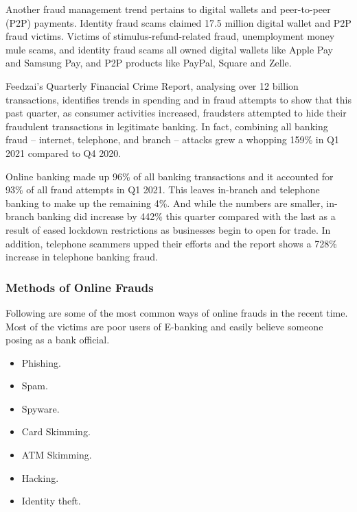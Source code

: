 \documentclass[12pt, oneside, a4paper]{article}
\begin{document}
Another fraud management trend pertains to digital wallets and peer-to-peer (P2P) payments. Identity fraud scams claimed 17.5 million digital wallet and P2P fraud victims. Victims of stimulus-refund-related fraud, unemployment money mule scams, and identity fraud scams all owned digital wallets like Apple Pay and Samsung Pay, and P2P products like PayPal, Square and Zelle. 

Feedzai's Quarterly Financial Crime Report, analysing over 12 billion transactions, identifies trends in spending and in fraud attempts to show that this past quarter, as consumer activities increased, fraudsters attempted to hide their fraudulent transactions in legitimate banking. In fact, combining all banking fraud  – internet, telephone, and branch – attacks grew a whopping 159\% in Q1 2021 compared to Q4 2020. 

Online banking made up 96\% of all banking transactions and it accounted for 93\% of all fraud attempts in Q1 2021. This leaves in-branch and telephone banking to make up the remaining 4\%. And while the numbers are smaller, in-branch banking did increase by 442\% this quarter compared with the last as a result of eased lockdown restrictions as businesses begin to open for trade. In addition, telephone scammers upped their efforts and the report shows a 728\% increase in telephone banking fraud.

\subsubsection{Methods of Online Frauds}
Following are some of the most common ways of online frauds in the recent time. Most of the victims are poor users of E-banking and easily believe someone posing as a bank official.
\begin{itemize}
    \item Phishing.
    \item Spam.
    \item Spyware.
    \item Card Skimming.
    \item ATM Skimming.
    \item Hacking.
    \item Identity theft.
\end{itemize}
\end{document}
